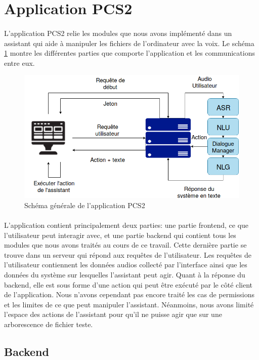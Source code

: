 \section{Application PCS2}
\paragraph{}L'application PCS2 relie les modules que nous avons implémenté dans un assistant qui aide à manipuler les fichiers de l'ordinateur avec la voix. Le schéma \ref{schema_app} montre les différentes parties que comporte l'application et les communications entre eux.
\begin{figure}[H] 
	\centering
	\includegraphics[width=0.95\linewidth]{images/Realisation/schema_app.png}
	\caption{Schéma générale de l'application PCS2}\label{schema_app}
\end{figure}
\paragraph{}L'application contient principalement deux parties: une partie frontend, ce que l'utilisateur peut interagir avec, et une partie backend qui contient tous les modules que nous avons traités au cours de ce travail. Cette dernière partie se trouve dans un serveur qui répond aux requêtes de l'utilisateur. Les requêtes de l'utilisateur contiennent les données audios collecté par l'interface ainsi que les données du système sur lesquelles l'assistant peut agir. Quant à la réponse du backend, elle est sous forme d'une action qui peut être exécuté par le côté client de l'application. Nous n'avons cependant pas encore traité les cas de permissions et les limites de ce que peut manipuler l'assistant. Néanmoins, nous avons limité l'espace des actions de l'assistant pour qu'il ne puisse agir que sur une arborescence de fichier teste.
\subsection{Backend}
